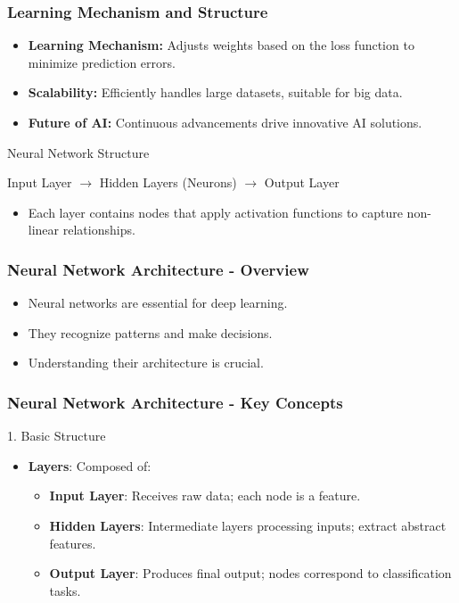 \documentclass[aspectratio=169]{beamer}
\begin{document}
\begin{frame}[fragile]
    \frametitle{Learning Mechanism and Structure}
    \begin{itemize}
        \item \textbf{Learning Mechanism:} Adjusts weights based on the loss function to minimize prediction errors.
        \item \textbf{Scalability:} Efficiently handles large datasets, suitable for big data.
        \item \textbf{Future of AI:} Continuous advancements drive innovative AI solutions.
    \end{itemize}
    
    \begin{block}{Neural Network Structure}
        \begin{center}
            Input Layer $\rightarrow$ Hidden Layers (Neurons) $\rightarrow$ Output Layer
        \end{center}
        \begin{itemize}
            \item Each layer contains nodes that apply activation functions to capture non-linear relationships.
        \end{itemize}
    \end{block}
\end{frame}

\begin{frame}[fragile]
    \frametitle{Neural Network Architecture - Overview}
    \begin{itemize}
        \item Neural networks are essential for deep learning.
        \item They recognize patterns and make decisions.
        \item Understanding their architecture is crucial.
    \end{itemize}
\end{frame}

\begin{frame}[fragile]
    \frametitle{Neural Network Architecture - Key Concepts}
    \begin{block}{1. Basic Structure}
        \begin{itemize}
            \item \textbf{Layers}: Composed of:
                \begin{itemize}
                    \item \textbf{Input Layer}: Receives raw data; each node is a feature.
                    \item \textbf{Hidden Layers}: Intermediate layers processing inputs; extract abstract features.
                    \item \textbf{Output Layer}: Produces final output; nodes correspond to classification tasks.
                \end{itemize}
        \end{itemize}
    \end{block}
\end{frame}
\end{document}
